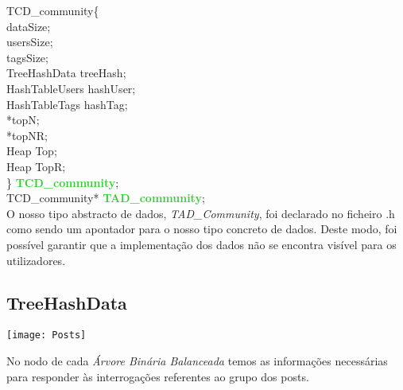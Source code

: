 \documentclass[10pt,a4paper]{article}
\begin{document}
 \noindent {\bf{\textcolor{Emerald}{typedef struct}}} TCD\_community\{\\
	\indent {\bf{\textcolor{Emerald}{int}}} dataSize; \\
	\indent {\bf{\textcolor{Emerald}{int}}} usersSize; \\
	\indent {\bf{\textcolor{Emerald}{int}}} tagsSize;\\
	\indent TreeHashData treeHash;\\
	\indent HashTableUsers hashUser;\\
	\indent HashTableTags hashTag;\\
	\indent {\bf{\textcolor{Emerald}{long}}} *topN;\\
	\indent {\bf{\textcolor{Emerald}{long}}} *topNR;\\
	\indent Heap Top;\\ 
	\indent Heap TopR; \\
\} {\bf{\textcolor{LimeGreen}{TCD\_community}}};	\\

 \noindent {\bf{\textcolor{Emerald}{typedef struct}}} TCD\_community* {\bf{\textcolor{LimeGreen}{TAD\_community}}};\\

O nosso tipo abstracto de dados, \textit{TAD\_Community}, foi declarado no ficheiro .h como sendo um apontador para o nosso tipo concreto de dados. Deste modo, foi possível garantir que a implementação dos dados não se encontra visível para os utilizadores.\\

\subsection{TreeHashData}
\begin{center}
\graphicspath{ {/home/jessica/Desktop/} }
\texttt{[image: Posts]}\\
\end{center}

No nodo de cada \textit{Árvore Binária Balanceada} temos as informações necessárias para responder às interrogações referentes ao grupo dos posts.\\
\end{document}

